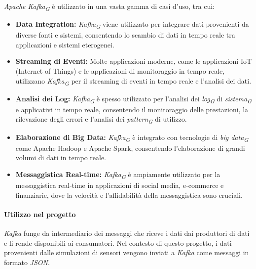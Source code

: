 \textit{Apache Kafka}\textsubscript{\textit{G}} è utilizzato in una vasta gamma di casi d'uso, tra cui:

\begin{itemize}
  \item \textbf{Data Integration:} \textit{Kafka}\textsubscript{\textit{G}} viene utilizzato per integrare dati provenienti da diverse fonti e sistemi, consentendo lo scambio di dati in tempo reale tra applicazioni e sistemi eterogenei.
  
  \item \textbf{Streaming di Eventi:} Molte applicazioni moderne, come le applicazioni IoT (Internet of Things) e le applicazioni di monitoraggio in tempo reale, utilizzano \textit{Kafka}\textsubscript{\textit{G}} per il streaming di eventi in tempo reale e l'analisi dei dati.
  
  \item \textbf{Analisi dei Log:} \textit{Kafka}\textsubscript{\textit{G}} è spesso utilizzato per l'analisi dei \textit{log}\textsubscript{\textit{G}} di \textit{sistema}\textsubscript{\textit{G}} e applicativi in tempo reale, consentendo il monitoraggio delle prestazioni, la rilevazione degli errori e l'analisi dei \textit{pattern}\textsubscript{\textit{G}} di utilizzo.
  
  \item \textbf{Elaborazione di Big Data:} \textit{Kafka}\textsubscript{\textit{G}} è integrato con tecnologie di \textit{big data}\textsubscript{\textit{G}} come Apache Hadoop e Apache Spark, consentendo l'elaborazione di grandi volumi di dati in tempo reale.
  
  \item \textbf{Messaggistica Real-time:} \textit{Kafka}\textsubscript{\textit{G}} è ampiamente utilizzato per la messaggistica real-time in applicazioni di social media, e-commerce e finanziarie, dove la velocità e l'affidabilità della messaggistica sono cruciali.
\end{itemize}

\paragraph{Utilizzo nel progetto}
\textit{Kafka} funge da intermediario dei messaggi che riceve i dati dai produttori di dati e li rende disponibili ai consumatori. Nel contesto di questo progetto, i dati provenienti dalle simulazioni di sensori vengono inviati a \textit{Kafka} come messaggi in formato \textit{JSON}.

